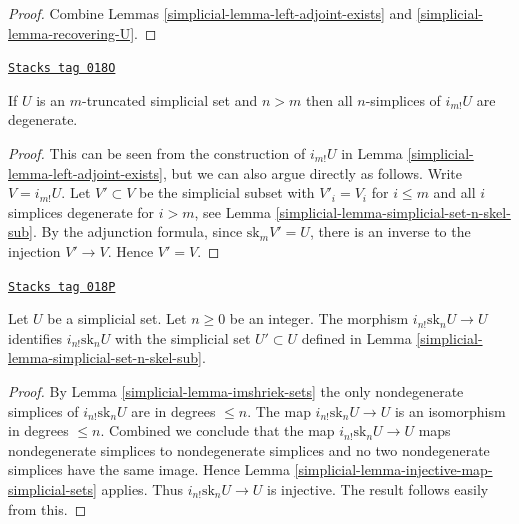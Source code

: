 \begin{proof}

Combine Lemmas \ref{simplicial-lemma-left-adjoint-exists} and \ref{simplicial-lemma-recovering-U}.
\end{proof}

\begin{lemma}
\label{simplicial-lemma-imshriek-sets}
\href{https://stacks.math.columbia.edu/tag/018O}{\texttt{Stacks tag 018O}}

If $U$ is an $m$-truncated simplicial set and $n > m$
then all $n$-simplices of $i_{m!}U$ are degenerate.
\end{lemma}

\begin{proof}

This can be seen from the construction of
$i_{m!}U$ in Lemma \ref{simplicial-lemma-left-adjoint-exists},
but we can also argue directly as follows.
Write $V = i_{m!}U$. Let $V' \subset V$ be the
simplicial subset with $V'_i = V_i$ for $i \leq m$
and all $i$ simplices degenerate for $i > m$,
see Lemma \ref{simplicial-lemma-simplicial-set-n-skel-sub}.
By the adjunction formula,
since $\text{sk}_m V' = U$, there is an inverse to the
injection $V' \to V$. Hence $V' = V$.
\end{proof}

\begin{lemma}
\label{simplicial-lemma-n-skeleton-sets}
\href{https://stacks.math.columbia.edu/tag/018P}{\texttt{Stacks tag 018P}}

Let $U$ be a simplicial set.
Let $n \geq 0$ be an integer.
The morphism $i_{n!} \text{sk}_n U \to U$ identifies
$i_{n!} \text{sk}_n U$ with the simplicial set
$U' \subset U$ defined in Lemma \ref{simplicial-lemma-simplicial-set-n-skel-sub}.
\end{lemma}

\begin{proof}

By Lemma \ref{simplicial-lemma-imshriek-sets} the only
nondegenerate simplices of $i_{n!} \text{sk}_n U$
are in degrees $\leq n$. The map
$i_{n!} \text{sk}_n U \to U$ is an isomorphism
in degrees $\leq n$. Combined we conclude
that the map $i_{n!} \text{sk}_n U \to U$ maps
nondegenerate simplices to nondegenerate simplices
and no two nondegenerate simplices have the same image.
Hence Lemma \ref{simplicial-lemma-injective-map-simplicial-sets} applies.
Thus $i_{n!} \text{sk}_n U \to U$
is injective. The result follows easily from this.
\end{proof}

